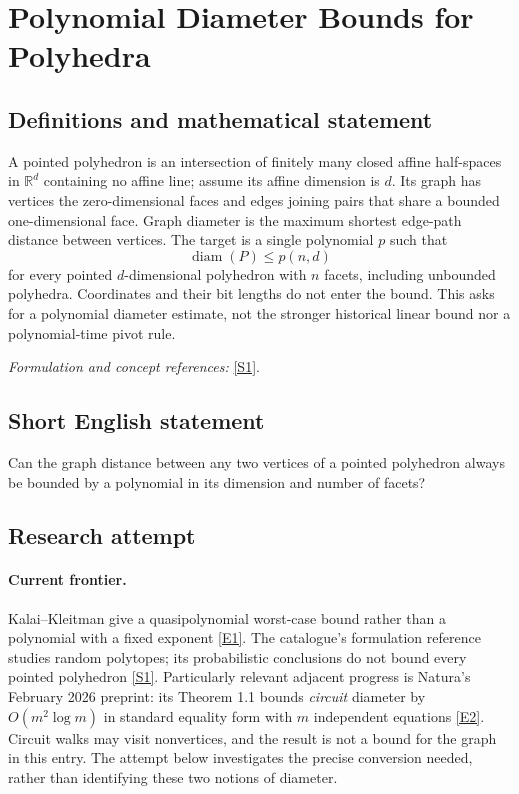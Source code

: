 \documentclass[11pt,a4paper]{article}
\newcommand{\R}{\mathbb{R}}
\newcommand{\sref}[2]{\hyperlink{source:#1:#2}{[S#2]}}
\newcommand{\eref}[2]{\hyperlink{extra:#1:#2}{[E#2]}}
\newif\ifshowcatalogue
\newcommand{\cataloguescope}[1]{\ifshowcatalogue
 \paragraph{Exact scope in the supplied catalogue.}
 \begin{quote}\small #1\end{quote}\fi}
\begin{document}
\setcounter{section}{0}
\clearpage
\section*{\texorpdfstring{Polynomial Diameter Bounds for Polyhedra}{Polynomial Diameter Bounds for Polyhedra}}\label{30001930}
\subsection{Definitions and mathematical statement}
A pointed polyhedron is an intersection of finitely many closed affine half-spaces in $\R^d$ containing no affine line; assume its affine dimension is $d$. Its graph has vertices the zero-dimensional faces and edges joining pairs that share a bounded one-dimensional face. Graph diameter is the maximum shortest edge-path distance between vertices. The target is a single polynomial $p$ such that
\[
 \operatorname{diam}(P)\le p(n,d)
\]
for every pointed $d$-dimensional polyhedron with $n$ facets, including unbounded polyhedra. Coordinates and their bit lengths do not enter the bound. This asks for a polynomial diameter estimate, not the stronger historical linear bound nor a polynomial-time pivot rule.
\par\smallskip\textit{Formulation and concept references:} \sref{30001930}{1}.
\cataloguescope{Prove or disprove that there is a polynomial p such that the vertex-edge graph of every pointed d-dimensional polyhedron, bounded or unbounded, with n facets has diameter at most p(n,d).}
\subsection{Short English statement}
Can the graph distance between any two vertices of a pointed polyhedron always be bounded by a polynomial in its dimension and number of facets?
\subsection{Research attempt}

\paragraph{Current frontier.}
Kalai--Kleitman give a quasipolynomial worst-case bound rather than a
polynomial with a fixed exponent \eref{30001930}{1}. The catalogue's formulation
reference studies random polytopes; its probabilistic conclusions do not
bound every pointed polyhedron \sref{30001930}{1}. Particularly relevant adjacent
progress is Natura's February 2026 preprint: its Theorem 1.1 bounds
\emph{circuit} diameter by $O(m^2\log m)$ in standard equality form with
$m$ independent equations \eref{30001930}{2}. Circuit walks may visit nonvertices,
and the result is not a bound for the graph in this entry. The attempt below
investigates the precise conversion needed, rather than identifying these
two notions of diameter.
\end{document}
